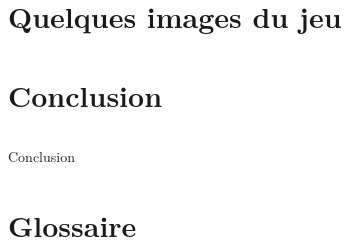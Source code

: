 \documentclass[titlepage, 13px, a4paper]{report}
\begin{document}

\newpage


\part{Quelques images du jeu}



\newpage


\part{Conclusion}
\paragraph{} \hspace{0pt}
Conclusion


\newpage


\part{Glossaire}
\paragraph{} \hspace{0pt}


\end{document}
